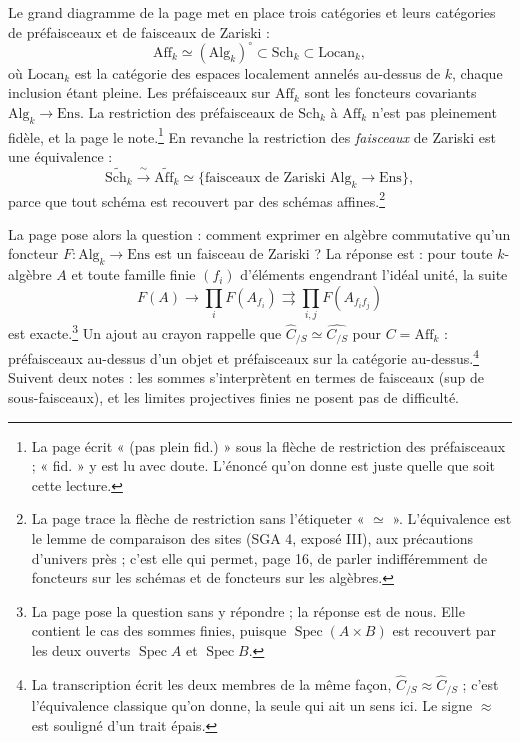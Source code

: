 \documentclass[11pt,a4paper]{article}
\begin{document}
Le grand diagramme de la page met en place trois catégories et leurs
catégories de préfaisceaux et de faisceaux de Zariski :
\[
\mathrm{Aff}_k \simeq (\mathrm{Alg}_k)^{\circ} \subset \mathrm{Sch}_k \subset \mathrm{Locan}_k ,
\]
où $\mathrm{Locan}_k$ est la catégorie des espaces localement annelés au-dessus
de $k$, chaque inclusion étant pleine. Les préfaisceaux sur $\mathrm{Aff}_k$
sont les foncteurs covariants $\mathrm{Alg}_k \to \mathrm{Ens}$. La restriction
des préfaisceaux de $\mathrm{Sch}_k$ à $\mathrm{Aff}_k$ n'est pas pleinement
fidèle, et la page le note.\footnote{La page écrit « (pas plein fid.) » sous la
flèche de restriction des préfaisceaux ; « fid. » y est lu avec doute. L'énoncé
qu'on donne est juste quelle que soit cette lecture.} En revanche la restriction des \emph{faisceaux} de
Zariski est une équivalence :
\[
\widetilde{\mathrm{Sch}_k} \xrightarrow{\ \sim\ } \widetilde{\mathrm{Aff}_k}
\simeq \{\text{faisceaux de Zariski } \mathrm{Alg}_k \to \mathrm{Ens}\} ,
\]
parce que tout schéma est recouvert par des schémas affines.\footnote{La page
trace la flèche de restriction sans l'étiqueter « $\simeq$ ». L'équivalence est
le lemme de comparaison des sites (SGA 4, exposé III), aux précautions d'univers
près ; c'est elle qui permet, page 16, de parler indifféremment de foncteurs sur
les schémas et de foncteurs sur les algèbres.}

La page pose alors la question : comment exprimer en algèbre commutative
qu'un foncteur $F : \mathrm{Alg}_k \to \mathrm{Ens}$ est un faisceau de
Zariski ? La réponse est : pour toute $k$-algèbre $A$ et toute famille finie
$(f_i)$ d'éléments engendrant l'idéal unité, la suite
\[
F(A) \to \prod_i F(A_{f_i}) \rightrightarrows \prod_{i,j} F(A_{f_i f_j})
\]
est exacte.\footnote{La page pose la question sans y répondre ; la réponse est
de nous. Elle contient le cas des sommes finies, puisque
$\operatorname{Spec}(A \times B)$ est recouvert par les deux ouverts
$\operatorname{Spec} A$ et $\operatorname{Spec} B$.} Un ajout au crayon rappelle
que $\widehat{C}_{/S} \simeq \widehat{C_{/S}}$ pour $C = \mathrm{Aff}_k$ :
préfaisceaux au-dessus d'un objet et préfaisceaux sur la catégorie
au-dessus.\footnote{La transcription écrit les deux membres de la même façon,
$\widehat{C}_{/S} \approx \widehat{C}_{/S}$ ; c'est l'équivalence classique
qu'on donne, la seule qui ait un sens ici. Le signe $\approx$ est souligné d'un
trait épais.} Suivent deux notes : les sommes s'interprètent en termes de
faisceaux (sup de sous-faisceaux), et les limites projectives finies ne posent
pas de difficulté.
\end{document}

